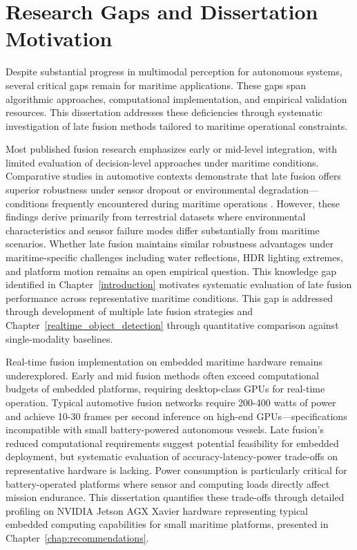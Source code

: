 \documentclass[../main.tex]{subfiles}
\begin{document}
\section{Research Gaps and Dissertation Motivation}

Despite substantial progress in multimodal perception for autonomous systems, several critical gaps remain for maritime applications. These gaps span algorithmic approaches, computational implementation, and empirical validation resources. This dissertation addresses these deficiencies through systematic investigation of late fusion methods tailored to maritime operational constraints.

Most published fusion research emphasizes early or mid-level integration, with limited evaluation of decision-level approaches under maritime conditions. Comparative studies in automotive contexts demonstrate that late fusion offers superior robustness under sensor dropout or environmental degradation—conditions frequently encountered during maritime operations \cite{huang2024a, wang2020a}. However, these findings derive primarily from terrestrial datasets where environmental characteristics and sensor failure modes differ substantially from maritime scenarios. Whether late fusion maintains similar robustness advantages under maritime-specific challenges including water reflections, HDR lighting extremes, and platform motion remains an open empirical question. This knowledge gap identified in Chapter~\ref{introduction} motivates systematic evaluation of late fusion performance across representative maritime conditions.
This gap is addressed through development of multiple late fusion strategies and Chapter~\ref{realtime_object_detection} through quantitative comparison against single-modality baselines.

Real-time fusion implementation on embedded maritime hardware remains underexplored. Early and mid fusion methods often exceed computational budgets of embedded platforms, requiring desktop-class GPUs for real-time operation. Typical automotive fusion networks require 200-400 watts of power and achieve 10-30 frames per second inference on high-end GPUs—specifications incompatible with small battery-powered autonomous vessels. Late fusion's reduced computational requirements suggest potential feasibility for embedded deployment, but systematic evaluation of accuracy-latency-power trade-offs on representative hardware is lacking. Power consumption is particularly critical for battery-operated platforms where sensor and computing loads directly affect mission endurance. This dissertation quantifies these trade-offs through detailed profiling on NVIDIA Jetson AGX Xavier hardware representing typical embedded computing capabilities for small maritime platforms, presented in Chapter~\ref{chap:recommendations}.
\end{document}
